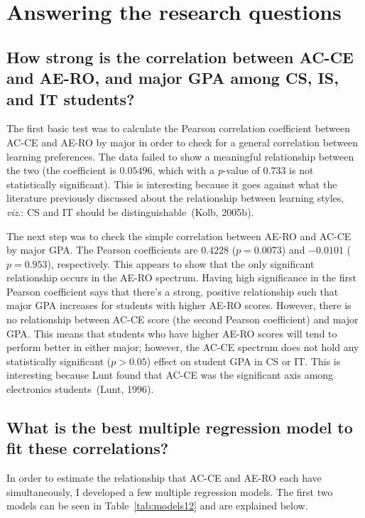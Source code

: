 \section{Answering the research questions}
\subsection{How strong is the correlation between AC-CE and AE-RO, and major GPA among CS, IS, and IT students?}
The first basic test was to calculate the Pearson correlation coefficient between AC-CE and AE-RO by major in order to check for a general correlation between learning preferences. The data failed to show a meaningful relationship between the two (the coefficient is $0.05496$, which with a \textit{p}-value of $0.733$ is not statistically significant). This is interesting because it goes against what the literature previously discussed about the relationship between learning styles, \textit{viz}.: CS and IT should be distinguishable~(Kolb, 2005b).

The next step was to check the simple correlation between AE-RO and AC-CE by major GPA. The Pearson coefficients are $0.4228$ ($p=0.0073$) and $-0.0101$ ($p=0.953$), respectively. This appears to show that the only significant relationship occurs in the AE-RO spectrum. Having high significance in the first Pearson coefficient says that there's a strong, positive relationship such that major GPA increases for students with higher AE-RO scores. However, there is no relationship between AC-CE score (the second Pearson coefficient) and major GPA. This means that students who have higher AE-RO scores will tend to perform better in either major; however, the AC-CE spectrum does not hold any statistically significant ($p>0.05$) effect on student GPA in CS or IT. This is interesting because Lunt found that AC-CE was the significant axis among electronics students~(Lunt, 1996).

\subsection{What is the best multiple regression model to fit these correlations?}
In order to estimate the relationship that AC-CE and AE-RO each have simultaneously, I developed a few multiple regression models. The first two models can be seen in Table~\ref{tab:models12} and are explained below.

